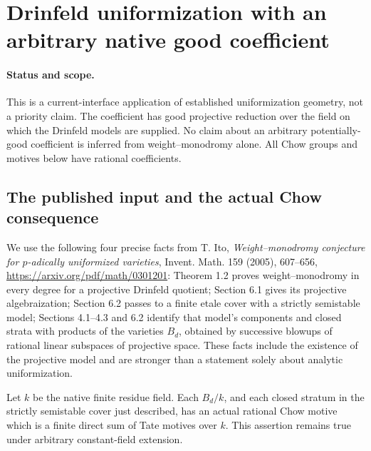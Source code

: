 \section{Drinfeld uniformization with an arbitrary native good coefficient}
\label{r20du:section}

\paragraph{Status and scope.}
This is a current-interface application of established uniformization
geometry, not a priority claim.  The coefficient has good projective
reduction over the field on which the Drinfeld models are supplied.
No claim about an arbitrary potentially-good coefficient is inferred
from weight--monodromy alone.  All Chow groups and motives below have
rational coefficients.

\subsection{The published input and the actual Chow consequence}

We use the following four precise facts from T. Ito,
\emph{Weight--monodromy conjecture for $p$-adically uniformized
varieties}, Invent. Math. 159 (2005), 607--656,
\url{https://arxiv.org/pdf/math/0301201}:
Theorem 1.2 proves weight--monodromy in every degree for a projective
Drinfeld quotient; Section 6.1 gives its projective algebraization;
Section 6.2 passes to a finite etale cover with a strictly semistable
model; Sections 4.1--4.3 and 6.2 identify that model's components and
closed strata with products of the varieties $B_d$, obtained by
successive blowups of rational linear subspaces of projective space.
These facts include the existence of the projective model and are
stronger than a statement solely about analytic uniformization.

\begin{lemma}
\label{r20du:tate}
Let $k$ be the native finite residue field.  Each $B_d/k$, and each
closed stratum in the strictly semistable cover just described, has
an actual rational Chow motive which is a finite direct sum of Tate
motives over $k$.  This assertion remains true under arbitrary
constant-field extension.
\end{lemma}

